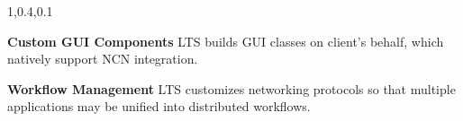 \begin{frame}{}
{\begin{minipage}{.98\textwidth}
\begin{lightquadblockc}{1,0.4,0.1}{\parbox{24cm}{}\vspace{8pt}}
\begin{minipage}{1.07\textwidth}
{\begin{enumerate}
\dmitem \textbf{Custom GUI Components}  \hspace{.5em} 
LTS builds GUI classes 
on client's behalf, which natively support NCN 
integration.
{\color[rgb]{0.3,0,0.1}{(dev: \$50K; licensing: \$5K/month)}}\vspace{16pt}

\dmitem \textbf{Workflow Management}  \hspace{.5em} 
LTS customizes networking 
protocols so that multiple applications may be 
unified into distributed workflows.\\
{\color[rgb]{0.3,0,0.1}{(dev: \$50K; licensing: \$15K/month)}}

\end{enumerate}
}\end{minipage}
\end{lightquadblockc}
\end{minipage}

}

\end{frame}
